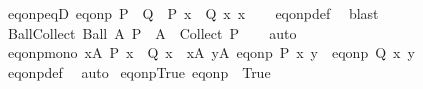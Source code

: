 \begin{isabellebody}
\endisatagproof
{\isafoldproof}%
%
\isadelimproof
\isanewline
%
\endisadelimproof
\isanewline
{}\isamarkupfalse%
\ eq{\isacharunderscore}{\kern0pt}onp{\isacharunderscore}{\kern0pt}eqD{\isacharcolon}{\kern0pt}\ {\isachardoublequoteopen}eq{\isacharunderscore}{\kern0pt}onp\ P\ {\isacharequal}{\kern0pt}\ Q\ {\isasymLongrightarrow}\ P\ x\ {\isacharequal}{\kern0pt}\ Q\ x\ x{\isachardoublequoteclose}\isanewline
%
\isadelimproof
\ \ %
\endisadelimproof
%
\isatagproof
{}\isamarkupfalse%
\ eq{\isacharunderscore}{\kern0pt}onp{\isacharunderscore}{\kern0pt}def\ \isamarkupfalse%
\ blast%
\endisatagproof
{\isafoldproof}%
%
\isadelimproof
\isanewline
%
\endisadelimproof
\isanewline
{}\isamarkupfalse%
\ Ball{\isacharunderscore}{\kern0pt}Collect{\isacharcolon}{\kern0pt}\ {\isachardoublequoteopen}Ball\ A\ P\ {\isacharequal}{\kern0pt}\ {\isacharparenleft}{\kern0pt}A\ {\isasymsubseteq}\ {\isacharparenleft}{\kern0pt}Collect\ P{\isacharparenright}{\kern0pt}{\isacharparenright}{\kern0pt}{\isachardoublequoteclose}\isanewline
%
\isadelimproof
\ \ %
\endisadelimproof
%
\isatagproof
{}\isamarkupfalse%
\ auto%
\endisatagproof
{\isafoldproof}%
%
\isadelimproof
\isanewline
%
\endisadelimproof
\isanewline
{}\isamarkupfalse%
\ eq{\isacharunderscore}{\kern0pt}onp{\isacharunderscore}{\kern0pt}mono{}{\isacharcolon}{\kern0pt}\ {\isachardoublequoteopen}{\isasymforall}x{\isasymin}A{\isachardot}{\kern0pt}\ P\ x\ {\isasymlongrightarrow}\ Q\ x\ {\isasymLongrightarrow}\ {\isasymforall}x{\isasymin}A{\isachardot}{\kern0pt}\ {\isasymforall}y{\isasymin}A{\isachardot}{\kern0pt}\ eq{\isacharunderscore}{\kern0pt}onp\ P\ x\ y\ {\isasymlongrightarrow}\ eq{\isacharunderscore}{\kern0pt}onp\ Q\ x\ y{\isachardoublequoteclose}\isanewline
%
\isadelimproof
\ \ %
\endisadelimproof
%
\isatagproof
{}\isamarkupfalse%
\ eq{\isacharunderscore}{\kern0pt}onp{\isacharunderscore}{\kern0pt}def\ \isamarkupfalse%
\ auto%
\endisatagproof
{\isafoldproof}%
%
\isadelimproof
\isanewline
%
\endisadelimproof
\isanewline
{}\isamarkupfalse%
\ eq{\isacharunderscore}{\kern0pt}onp{\isacharunderscore}{\kern0pt}True{\isacharcolon}{\kern0pt}\ {\isachardoublequoteopen}eq{\isacharunderscore}{\kern0pt}onp\ {\isacharparenleft}{\kern0pt}{\isasymlambda}{\isacharunderscore}{\kern0pt}{\isachardot}{\kern0pt}\ True{\isacharparenright}{\kern0pt}\ {\isacharequal}{\kern0pt}\ {\isacharparenleft}{\kern0pt}{\isacharequal}{\kern0pt}{\isacharparenright}{\kern0pt}{\isachardoublequoteclose}\isanewline
%

\end{isabellebody}
